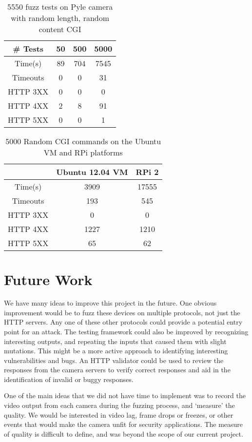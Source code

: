 \documentclass[letterpaper,twocolumn,10pt]{article}
\begin{document}
\begin{table}[h]
\centering
	\begin{tabular}{ |c|c|c|c| }
		\hline
		\# Tests & 50 & 500 & 5000 \\
		\hline
		\hline
		Time(s) & 89 & 704 & 7545 \\
		Timeouts & 0 & 0 & 31  \\
		HTTP 3XX & 0 & 0 & 0 \\
		HTTP 4XX & 2 & 8 & 91 \\
		HTTP 5XX & 0 & 0 & 1 \\
		\hline
	\end{tabular}
	\caption{5550 fuzz tests on Pyle camera with random length, random content CGI}
	\label{tab:Pyle_Rand_CGI} 
\end{table}

\begin{table}[h]
\centering
	\begin{tabular}{ |c|c|c| }
		\hline
		~ & Ubuntu 12.04 VM & RPi 2\\
		\hline
		\hline
		Time(s) & 3909 & 17555 \\
		Timeouts & 193 & 545  \\
		HTTP 3XX & 0 & 0 \\
		HTTP 4XX & 1227 & 1210 \\
		HTTP 5XX & 65 & 62 \\
		\hline
	\end{tabular}
	\caption{5000 Random CGI commands on the Ubuntu VM and RPi platforms}
	\label{tab:VMvsPi} 
\end{table}

\section{Future Work}
We have many ideas to improve this project in the future. One obvious improvement would be to fuzz these devices on multiple protocols, not just the HTTP servers. Any one of these other protocols could provide a potential entry point for an attack. The testing framework could also be improved by recognizing interesting outputs, and repeating the inputs that caused them with slight mutations. This might be a more active approach to identifying interesting vulnerabilities and bugs. An HTTP validator could be used to review the responses from the camera servers to verify correct responses and aid in the identification of invalid or buggy responses. 

One of the main ideas that we did not have time to implement was to record the video output from each camera during the fuzzing process, and `measure' the quality. We would be interested in video lag, frame drops or freezes, or other events that would make the camera unfit for security applications. The measure of quality is difficult to define, and was beyond the scope of our current project. 
\end{document}
